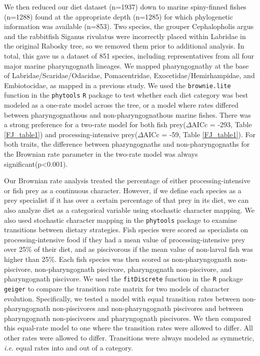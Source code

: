 We then reduced our diet dataset (n=1937) down to marine spiny-finned fishes (n=1288) found at the appropriate depth (n=1285) for which phylogenetic information \cite{rabosky2013rates} was available (n=853). Two species, the grouper Cephalopholis argus and the rabbitfish Siganus rivulatus were incorrectly placed within Labridae in the original Rabosky tree, \cite{rabosky2013rates} so we removed them prior to additional analysis. In total, this gave us a dataset of 851 species, including representatives from all four major marine pharyngognath lineages. We mapped pharyngognathy at the base of Labridae/Scaridae/Odacidae, Pomacentridae, Exocetidae/Hemirhampidae, and Embiotocidae, as mapped in a previous study. \cite{wainwright_evolution_2012} We used the {\tt brownie.lite} function in the {\tt phytools} \cite{revell2012phytools} {\tt R} package to test whether each diet category was best modeled as a one-rate model across the tree, or a model where rates differed between pharyngognathous and non-pharyngognathous marine fishes. There was a strong preference for a two-rate model for both fish prey($\Delta$AICc = -293, Table \ref{FJ_table1}) and processing-intensive prey($\Delta$AICc = -59, Table \ref{FJ_table1}). For both traits, the difference between pharyngognaths and non-pharyngognaths for the Brownian rate parameter in the two-rate model was always significant(p<0.001).

Our Brownian rate analysis treated the percentage of either processing-intensive or fish prey as a continuous character. However, if we define each species as a prey specialist if it has over a certain percentage of that prey in its diet, we can also analyze diet as a categorical variable using stochastic character mapping. We also used stochastic character mapping in the {\tt phytools} package \cite{revell2012phytools} to examine transitions between dietary strategies. Fish species were scored as specialists on processing-intensive food if they had a mean value of processing-intensive prey over 25\% of their diet, and as piscivorous if the mean value of non-larval fish was higher than 25\%. Each fish species was then scored as non-pharyngognath non-piscivore, non-pharyngognath piscivore, pharyngognath non-piscivore, and pharyngognath piscivore. We used the {\tt fitDiscrete} function in the {\tt R} package {\tt geiger} \cite{harmon2008geiger} to compare the transition rate matrix for two models of character evolution. Specifically, we tested a model with equal transition rates between non-pharyngognath non-piscivores and non-pharyngognath piscivores and between pharyngognath non-piscivores and pharyngognath piscivores. We then compared this equal-rate model to one where the transition rates were allowed to differ. All other rates were allowed to differ. Transitions were always modeled as symmetric, {\em i.e.} equal rates into and out of a category.

